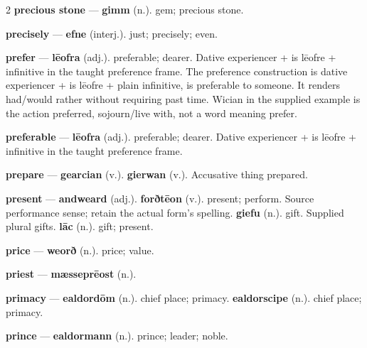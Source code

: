 \begin{multicols}{2}
\textbf{precious stone} — \textbf{gimm} (n.). gem; precious stone.\par
\textbf{precisely} — \textbf{efne} (interj.). just; precisely; even.\par
\textbf{prefer} — \textbf{lēofra} (adj.). preferable; dearer. Dative experiencer + is lēofre + infinitive in the taught preference frame. The preference construction is dative experiencer + is lēofre + plain infinitive, is preferable to someone. It renders had/would rather without requiring past time. Wician in the supplied example is the action preferred, sojourn/live with, not a word meaning prefer.\par
\textbf{preferable} — \textbf{lēofra} (adj.). preferable; dearer. Dative experiencer + is lēofre + infinitive in the taught preference frame.\par
\textbf{prepare} — \textbf{gearcian} (v.).  \textbf{gierwan} (v.). Accusative thing prepared.\par
\textbf{present} — \textbf{andweard} (adj.).  \textbf{forðtēon} (v.). present; perform. Source performance sense; retain the actual form's spelling. \textbf{giefu} (n.). gift. Supplied plural gifts. \textbf{lāc} (n.). gift; present.\par
\textbf{price} — \textbf{weorð} (n.). price; value.\par
\textbf{priest} — \textbf{mæsseprēost} (n.).\par
\textbf{primacy} — \textbf{ealdordōm} (n.). chief place; primacy. \textbf{ealdorscipe} (n.). chief place; primacy.\par
\textbf{prince} — \textbf{ealdormann} (n.). prince; leader; noble.\par

\end{multicols}
